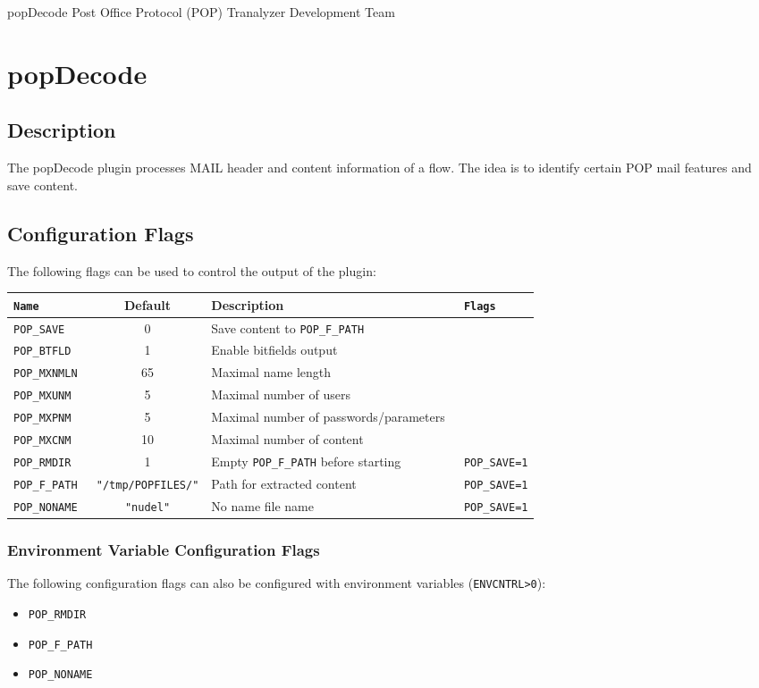 \documentclass[documentation]{subfiles}
\begin{document}
\trantitle
    {popDecode}
    {Post Office Protocol (POP)}
    {Tranalyzer Development Team} %

\section{popDecode}\label{s:popDecode}

\subsection{Description}
The popDecode plugin processes MAIL header and content information of a flow.
The idea is to identify certain POP mail features and save content.

\subsection{Configuration Flags}
The following flags can be used to control the output of the plugin:
\begin{longtable}{>{\tt}lcl>{\tt\small}l}
    \toprule
    {\bf Name} & {\bf Default} & {\bf Description} & {\bf Flags}\\
    \midrule\endhead%
    POP\_SAVE    &  0 & Save content to {\tt\small POP\_F\_PATH}       & \\
    POP\_BTFLD   &  1 & Enable bitfields output                        & \\
    POP\_MXNMLN  & 65 & Maximal name length                            & \\
    POP\_MXUNM   &  5 & Maximal number of users                        & \\
    POP\_MXPNM   &  5 & Maximal number of passwords/parameters         & \\
    POP\_MXCNM   & 10 & Maximal number of content                      & \\

    POP\_RMDIR   &  1 & Empty {\tt\small POP\_F\_PATH} before starting & POP\_SAVE=1\\
    POP\_F\_PATH & {\tt\small "/tmp/POPFILES/"}
                      & Path for extracted content                     & POP\_SAVE=1\\
    POP\_NONAME  & {\tt\small "nudel"}
                      & No name file name                              & POP\_SAVE=1\\
    \bottomrule
\end{longtable}

\subsubsection{Environment Variable Configuration Flags}
The following configuration flags can also be configured with environment variables ({\tt ENVCNTRL>0}):
\begin{itemize}
    \item {\tt POP\_RMDIR}
    \item {\tt POP\_F\_PATH}
    \item {\tt POP\_NONAME}
\end{itemize}
\end{document}
